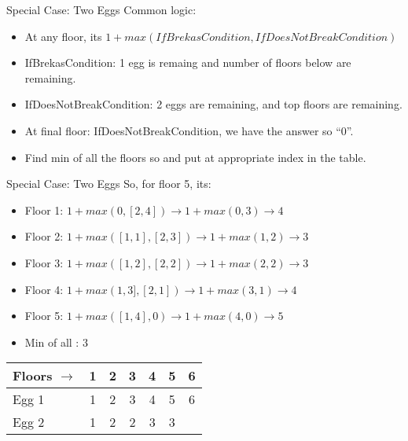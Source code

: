    \begin{frame}[fragile]{Special Case: Two Eggs}
Common logic:
\begin{itemize}
\item At any floor, its $1 + max(IfBrekasCondition,IfDoesNotBreakCondition)$
\item IfBrekasCondition: 1 egg is remaing and number of floors below are remaining.
\item IfDoesNotBreakCondition: 2 eggs are remaining, and top floors are remaining.
\item At final floor: IfDoesNotBreakCondition, we have the answer so ``0''.
\item Find min of all the floors so and put at appropriate index in the table.
\end{itemize}
\end{frame}

   \begin{frame}[fragile]{Special Case: Two Eggs}
So, for floor 5, its:
\begin{itemize}
\item Floor 1:  $1 + max (0,[2,4]) \rightarrow 1 + max (0,3) \rightarrow 4$
\item Floor 2:  $1 + max ([1,1],[2,3]) \rightarrow 1 + max (1,2) \rightarrow 3$
\item Floor 3:  $1 + max ([1,2],[2,2]) \rightarrow 1 + max (2,2) \rightarrow 3$
\item Floor 4:  $1 + max (1,3],[2,1]) \rightarrow 1 + max (3,1) \rightarrow 4$
\item Floor 5:  $1 + max ([1,4],0) \rightarrow 1 + max (4,0) \rightarrow 5$
\item Min of all : 3
\end{itemize}
 \begin{center}
 \begin{tabular}{|l|c|c|c|c|c|c|}
 \hline
Floors $\rightarrow$ & 1 &  2 &   3 &   4 & 5 &  6\\  \hline
Egg 1 & 1 & 2 & 3 & 4 & 5 & 6\\
Egg 2 & 1 & 2 & 2 & 3 & 3\\
 \hline
 \end{tabular}
 \end{center}
\end{frame}

